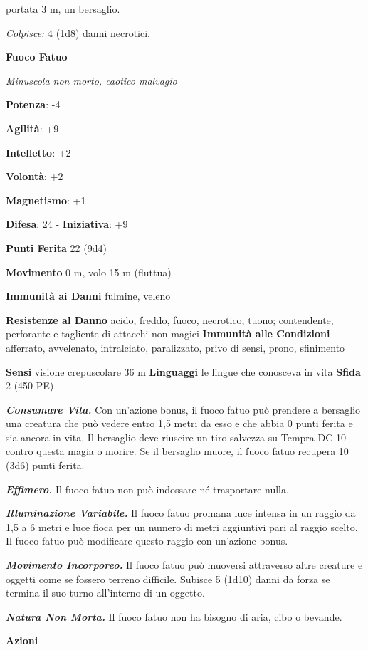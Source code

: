 \begin{multicols}{2}
portata 3 m, un bersaglio.

\emph{Colpisce:} 4 (1d8) danni necrotici.

\textbf{Fuoco Fatuo}

\emph{Minuscola non morto, caotico malvagio}

\textbf{Potenza}: -4

\textbf{Agilità}: +9

\textbf{Intelletto}: +2

\textbf{Volontà}: +2

\textbf{Magnetismo}: +1

\textbf{Difesa}: 24 - \textbf{Iniziativa}: +9

\textbf{Punti Ferita} 22 (9d4)

\textbf{Movimento} 0 m, volo 15 m (fluttua)

\textbf{Immunità ai Danni} fulmine, veleno

\textbf{Resistenze al Danno} acido, freddo, fuoco, necrotico, tuono;
contendente, perforante e tagliente di attacchi non magici
\textbf{Immunità alle Condizioni} afferrato, avvelenato, intralciato,
paralizzato, privo di sensi, prono, sfinimento

\textbf{Sensi} visione crepuscolare 36 m
\textbf{Linguaggi} le lingue che conosceva in vita \textbf{Sfida} 2 (450
PE)

\emph{\textbf{Consumare Vita.}} Con un'azione bonus, il fuoco fatuo può
prendere a bersaglio una creatura che può vedere entro 1,5 metri da esso
e che abbia 0 punti ferita e sia ancora in vita. Il bersaglio deve
riuscire un tiro salvezza su Tempra DC 10 contro questa magia o
morire. Se il bersaglio muore, il fuoco fatuo recupera 10 (3d6) punti
ferita.

\emph{\textbf{Effimero.}} Il fuoco fatuo non può indossare né
trasportare nulla.

\emph{\textbf{Illuminazione Variabile.}} Il fuoco fatuo promana luce
intensa in un raggio da 1,5 a 6 metri e luce fioca per un numero di
metri aggiuntivi pari al raggio scelto. Il fuoco fatuo può modificare
questo raggio con un'azione bonus.

\emph{\textbf{Movimento Incorporeo.}} Il fuoco fatuo può muoversi
attraverso altre creature e oggetti come se fossero terreno difficile.
Subisce 5 (1d10) danni da forza se termina il suo turno all'interno di
un oggetto.

\emph{\textbf{Natura Non Morta.}} Il fuoco fatuo non ha bisogno di aria,
cibo o bevande.

\textbf{Azioni}


\end{multicols}

